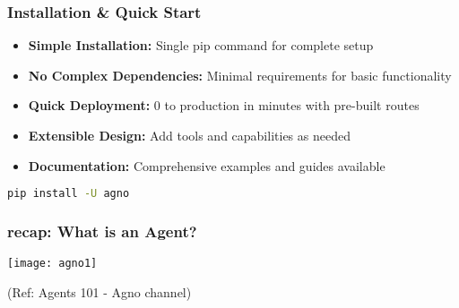 \begin{frame}[fragile]\frametitle{Installation \& Quick Start}
      \begin{itemize}
	\item \textbf{Simple Installation:} Single pip command for complete setup
	\item \textbf{No Complex Dependencies:} Minimal requirements for basic functionality
	\item \textbf{Quick Deployment:} 0 to production in minutes with pre-built routes
	\item \textbf{Extensible Design:} Add tools and capabilities as needed
	\item \textbf{Documentation:} Comprehensive examples and guides available
	  \end{itemize}
      
      \begin{lstlisting}[language=bash]
pip install -U agno
      \end{lstlisting}
\end{frame}

\begin{frame}[fragile]\frametitle{recap: What is an Agent?}

\begin{center}
\texttt{[image: agno1]}

{\tiny (Ref: Agents 101 - Agno channel)}
\end{center}	  
\end{frame}

